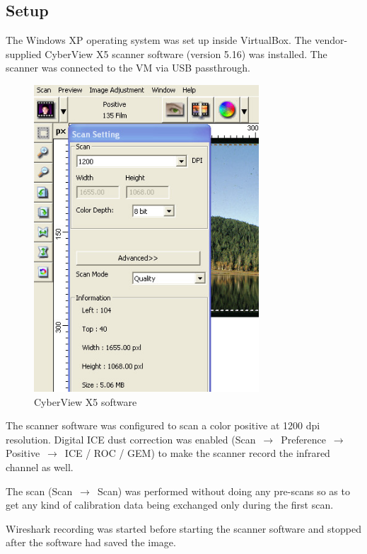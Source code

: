 \documentclass{article}
\begin{document}
\subsection{Setup}

The Windows XP operating system was set up inside VirtualBox. The
vendor-supplied CyberView X5 scanner software \cite{cvx5} (version 5.16) was installed.
The scanner was connected to the VM via USB passthrough.

\begin{figure}[H]
  \caption{CyberView X5 software}
  \centering
  \includegraphics[width=0.75\textwidth]{images/extract_cvx.jpg}
\end{figure}

The scanner software was configured to scan a color positive at 1200 dpi resolution.
Digital ICE dust correction was enabled (Scan $\,\to\,$ Preference $\,\to\,$ Positive $\,\to\,$ ICE / ROC / GEM) to make the scanner
record the infrared channel as well.

The scan (Scan $\,\to\,$ Scan) was performed without doing any pre-scans so as to
get any kind of calibration data being exchanged only during the first scan.

Wireshark recording was started before starting the scanner software and stopped
after the software had saved the image.
\end{document}
